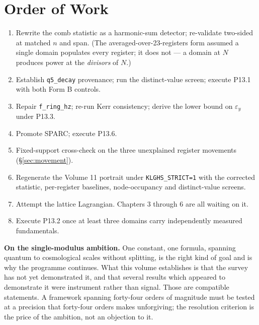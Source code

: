\documentclass[11pt, letterpaper, openany]{book}
\begin{document}
\section{Order of Work}

\begin{enumerate}
  \item Rewrite the comb statistic as a harmonic-sum detector; re-validate two-sided at matched $n$
        and span. (The averaged-over-23-registers form assumed a single domain populates every
        register; it does not --- a domain at $N$ produces power at the \emph{divisors} of $N$.)
  \item Establish \texttt{q5\_decay} provenance; run the distinct-value screen; execute P13.1 with
        both Form B controls.
  \item Repair \texttt{f\_ring\_hz}; re-run Kerr consistency; derive the lower bound on
        $\varepsilon_y$ under P13.3.
  \item Promote SPARC; execute P13.6.
  \item Fixed-support cross-check on the three unexplained register movements (\S\ref{sec:movement}).
  \item Regenerate the Volume 11 portrait under \texttt{KLGHS\_STRICT=1} with the corrected
        statistic, per-register baselines, node-occupancy and distinct-value screens.
  \item Attempt the lattice Lagrangian. Chapters 3 through 6 are all waiting on it.
  \item Execute P13.2 once at least three domains carry independently measured fundamentals.
\end{enumerate}

\begin{warningbox}
\textbf{On the single-modulus ambition.} One constant, one formula, spanning quantum to cosmological
scales without splitting, is the right kind of goal and is why the programme continues. What this
volume establishes is that the survey has not yet demonstrated it, and that several results which
appeared to demonstrate it were instrument rather than signal. Those are compatible statements. A
framework spanning forty-four orders of magnitude must be tested at a precision that forty-four
orders makes unforgiving; the resolution criterion is the price of the ambition, not an objection
to it.
\end{warningbox}

\end{document}
